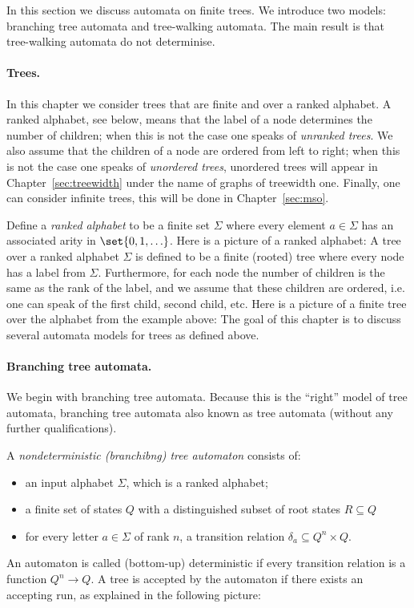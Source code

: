 \label{sec:twa}

\newcommand{\dfs}{search\xspace}
In this section we discuss automata on finite trees. We introduce two models: branching tree automata and tree-walking automata. The main result is that tree-walking automata do not determinise.

\paragraph*{Trees.}
In this chapter we consider trees that are finite and over a ranked alphabet. A ranked alphabet, see below, means that the label of a node determines the number of children; when this is not the case one speaks of \emph{unranked trees}. We also assume that the children of a node are ordered from left to right; when this is not the case one speaks of \emph{unordered trees}, unordered trees will appear in Chapter~\ref{sec:treewidth} under the name of graphs of treewidth one. Finally, one can consider infinite trees, this will be done in Chapter~\ref{sec:mso}.

 Define a \emph{ranked alphabet} to be a finite set $\Sigma$ where every element $a \in \Sigma$ has an associated arity in $\set{0,1,\ldots}$. Here is a picture of a ranked alphabet:
A  tree over a ranked alphabet $\Sigma$ is defined to be a finite (rooted) tree where every node has a label from $\Sigma$. Furthermore, for each node the number of children is the same as the rank of the label, and we assume that these children are ordered, i.e. one can speak of the first child, second child, etc. Here is a picture of a finite tree over the alphabet from the example above:
The goal of this chapter is to discuss several automata models for trees as defined above.
\paragraph*{Branching tree automata.} We begin with branching tree automata. Because this is the ``right'' model of tree automata, branching tree automata  also known as tree automata (without any further qualifications).
\begin{definition}
A \emph{nondeterministic (branchibng) tree automaton} consists of:
\begin{itemize}
	\item an input alphabet $\Sigma$, which is a ranked alphabet;
	\item a finite set of states $Q$ with a distinguished subset of root states $R \subseteq Q$
\item for every letter $a \in \Sigma$ of rank $n$, a transition relation $ \delta_a \subseteq Q^n \times Q$.
\end{itemize}
An automaton is called (bottom-up) deterministic if every transition relation is  a function $Q^n \to Q$.	 A tree is accepted by the automaton if there exists an accepting run, as explained in the following picture:
\end{definition}


